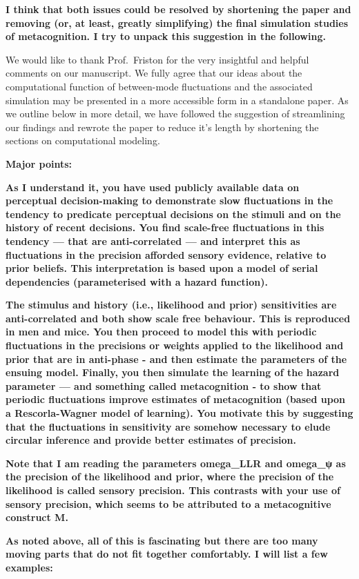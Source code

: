 \documentclass[
]{article}
\begin{document}
\textbf{I think that both issues could be resolved by shortening the
paper and removing (or, at least, greatly simplifying) the final
simulation studies of metacognition. I try to unpack this suggestion in
the following.}

We would like to thank Prof.~Friston for the very insightful and helpful
comments on our manuscript. We fully agree that our ideas about the
computational function of between-mode fluctuations and the associated
simulation may be presented in a more accessible form in a standalone
paper. As we outline below in more detail, we have followed the
suggestion of streamlining our findings and rewrote the paper to reduce
it's length by shortening the sections on computational modeling.

\textbf{Major points:}

\textbf{As I understand it, you have used publicly available data on
perceptual decision-making to demonstrate slow fluctuations in the
tendency to predicate perceptual decisions on the stimuli and on the
history of recent decisions. You find scale-free fluctuations in this
tendency --- that are anti-correlated --- and interpret this as
fluctuations in the precision afforded sensory evidence, relative to
prior beliefs. This interpretation is based upon a model of serial
dependencies (parameterised with a hazard function).}

\textbf{The stimulus and history (i.e., likelihood and prior)
sensitivities are anti-correlated and both show scale free behaviour.
This is reproduced in men and mice. You then proceed to model this with
periodic fluctuations in the precisions or weights applied to the
likelihood and prior that are in anti-phase - and then estimate the
parameters of the ensuing model. Finally, you then simulate the learning
of the hazard parameter --- and something called metacognition - to show
that periodic fluctuations improve estimates of metacognition (based
upon a Rescorla-Wagner model of learning). You motivate this by
suggesting that the fluctuations in sensitivity are somehow necessary to
elude circular inference and provide better estimates of precision.}

\textbf{Note that I am reading the parameters omega\_LLR and omega\_ψ as
the precision of the likelihood and prior, where the precision of the
likelihood is called sensory precision. This contrasts with your use of
sensory precision, which seems to be attributed to a metacognitive
construct M.}

\textbf{As noted above, all of this is fascinating but there are too
many moving parts that do not fit together comfortably. I will list a
few examples:}
\end{document}
